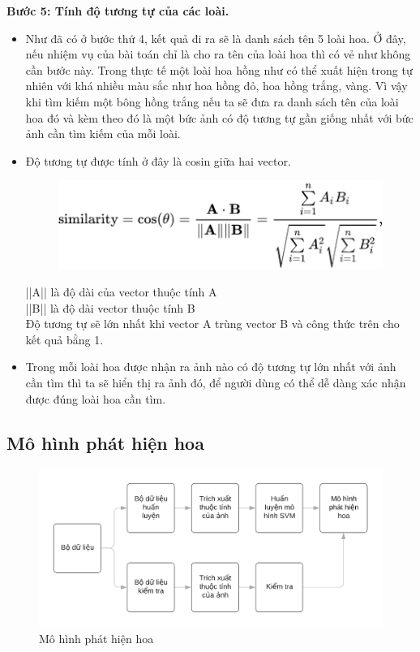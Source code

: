 \documentclass[12pt]{report}
\begin{document}
												
		\textbf{Bước 5: Tính độ tương tự của các loài.} 
		\begin{itemize}
			\item Như đã có ở bước thứ 4, kết quả đi ra sẽ là danh sách tên 5 loài hoa. Ở đây, nếu nhiệm vụ của bài toán chỉ là cho ra tên của loài hoa thì có vẻ như không cần bước này. Trong thực tế một loài hoa hồng như có thể xuất hiện trong tự nhiên với khá nhiều màu sắc như hoa hồng đỏ, hoa hồng trắng, vàng. Vì vậy khi tìm kiếm một bông hồng trắng nếu ta sẽ đưa ra danh sách tên của loài hoa đó và kèm theo đó là một bức ảnh có độ tương tự gần giống nhất với bức ảnh cần tìm kiếm của mỗi loài.
			\item Độ tương tự được tính ở đây là cosin giữa hai vector.
			      			      			      			      			      			
			       
			       \begin{figure}[h]
			       	\centering
			       	\includegraphics[scale=0.6]{cosin}
			       \end{figure}
			      ||A|| là độ dài của vector thuộc tính A\\
			       ||B|| là độ dài vector thuộc tính B\\
			       Độ tương tự sẽ lớn nhất khi vector A trùng vector B và công thức trên cho kết quả bằng 1.
			\item Trong mỗi loài hoa được nhận ra ảnh nào có độ tương tự lớn nhất với ảnh cần tìm thì ta sẽ hiển thị ra ảnh đó, để người dùng có thể dễ dàng xác nhận được đúng loài hoa cần tìm.
		\end{itemize}	
														
		\subsection{Mô hình phát hiện hoa}
		\begin{figure}[h]
			\centering
			\includegraphics[scale=0.4]{mohinh_phathien}
			\caption{Mô hình phát hiện hoa}
			\label{fig:mohinh_phathien}
		\end{figure}
										
\end{document}
